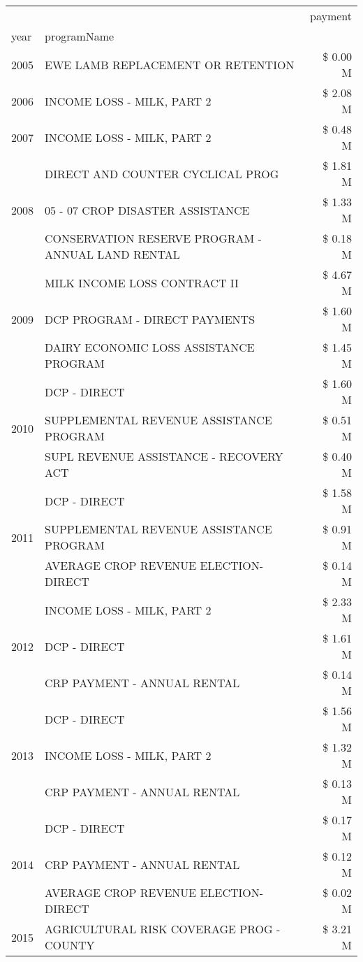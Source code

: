\begin{tabular}{llr}
\toprule
 &  & payment \\
year & programName &  \\
\midrule
2005 & EWE LAMB REPLACEMENT OR RETENTION & \$ 0.00 M \\
\cline{1-3}
2006 & INCOME LOSS - MILK, PART 2 & \$ 2.08 M \\
\cline{1-3}
2007 & INCOME LOSS - MILK, PART 2 & \$ 0.48 M \\
\cline{1-3}
\multirow[t]{3}{*}{2008} & DIRECT AND COUNTER CYCLICAL PROG & \$ 1.81 M \\
 & 05 - 07 CROP DISASTER ASSISTANCE & \$ 1.33 M \\
 & CONSERVATION RESERVE PROGRAM - ANNUAL LAND RENTAL & \$ 0.18 M \\
\cline{1-3}
\multirow[t]{3}{*}{2009} & MILK INCOME LOSS CONTRACT II & \$ 4.67 M \\
 & DCP PROGRAM - DIRECT PAYMENTS & \$ 1.60 M \\
 & DAIRY ECONOMIC LOSS ASSISTANCE PROGRAM & \$ 1.45 M \\
\cline{1-3}
\multirow[t]{3}{*}{2010} & DCP - DIRECT & \$ 1.60 M \\
 & SUPPLEMENTAL REVENUE ASSISTANCE PROGRAM & \$ 0.51 M \\
 & SUPL REVENUE ASSISTANCE - RECOVERY ACT & \$ 0.40 M \\
\cline{1-3}
\multirow[t]{3}{*}{2011} & DCP - DIRECT & \$ 1.58 M \\
 & SUPPLEMENTAL REVENUE ASSISTANCE PROGRAM & \$ 0.91 M \\
 & AVERAGE CROP REVENUE ELECTION-DIRECT & \$ 0.14 M \\
\cline{1-3}
\multirow[t]{3}{*}{2012} & INCOME LOSS - MILK, PART 2 & \$ 2.33 M \\
 & DCP - DIRECT & \$ 1.61 M \\
 & CRP PAYMENT - ANNUAL RENTAL & \$ 0.14 M \\
\cline{1-3}
\multirow[t]{3}{*}{2013} & DCP - DIRECT & \$ 1.56 M \\
 & INCOME LOSS - MILK, PART 2 & \$ 1.32 M \\
 & CRP PAYMENT - ANNUAL RENTAL & \$ 0.13 M \\
\cline{1-3}
\multirow[t]{3}{*}{2014} & DCP - DIRECT & \$ 0.17 M \\
 & CRP PAYMENT - ANNUAL RENTAL & \$ 0.12 M \\
 & AVERAGE CROP REVENUE ELECTION-DIRECT & \$ 0.02 M \\
\cline{1-3}
\multirow[t]{3}{*}{2015} & AGRICULTURAL RISK COVERAGE PROG - COUNTY & \$ 3.21 M \\

\end{tabular}
